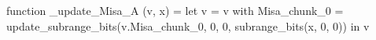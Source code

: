 function _update_Misa_A (v, x) = let v = { v with Misa_chunk_0 = update_subrange_bits(v.Misa_chunk_0, 0, 0, subrange_bits(x, 0, 0)) } in
  v
